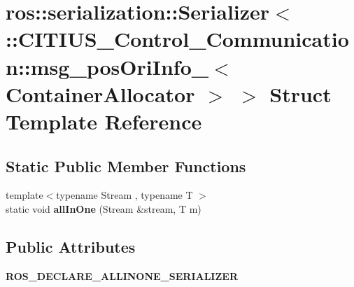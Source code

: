 \hypertarget{structros_1_1serialization_1_1_serializer_3_01_1_1_c_i_t_i_u_s___control___communication_1_1msg_889a6ecf4403a6e0729d3a6c3dc84456}{\section{ros\-:\-:serialization\-:\-:\-Serializer$<$ \-:\-:\-C\-I\-T\-I\-U\-S\-\_\-\-Control\-\_\-\-Communication\-:\-:msg\-\_\-pos\-Ori\-Info\-\_\-$<$ \-Container\-Allocator $>$ $>$ \-Struct \-Template \-Reference}
\label{structros_1_1serialization_1_1_serializer_3_01_1_1_c_i_t_i_u_s___control___communication_1_1msg_889a6ecf4403a6e0729d3a6c3dc84456}
}
\subsection*{\-Static \-Public \-Member \-Functions}
\begin{DoxyCompactItemize}
\item 
\hypertarget{structros_1_1serialization_1_1_serializer_3_01_1_1_c_i_t_i_u_s___control___communication_1_1msg_889a6ecf4403a6e0729d3a6c3dc84456_a9b470fddd584bebeaf1e292825ff7af5}{{\footnotesize template$<$typename Stream , typename T $>$ }\\static void {\bfseries all\-In\-One} (\-Stream \&stream, \-T m)}\label{structros_1_1serialization_1_1_serializer_3_01_1_1_c_i_t_i_u_s___control___communication_1_1msg_889a6ecf4403a6e0729d3a6c3dc84456_a9b470fddd584bebeaf1e292825ff7af5}

\end{DoxyCompactItemize}
\subsection*{\-Public \-Attributes}
\begin{DoxyCompactItemize}
\item 
\hypertarget{structros_1_1serialization_1_1_serializer_3_01_1_1_c_i_t_i_u_s___control___communication_1_1msg_889a6ecf4403a6e0729d3a6c3dc84456_ad35d4bcad909dbd0978ab699dbc40560}{{\bfseries \-R\-O\-S\-\_\-\-D\-E\-C\-L\-A\-R\-E\-\_\-\-A\-L\-L\-I\-N\-O\-N\-E\-\_\-\-S\-E\-R\-I\-A\-L\-I\-Z\-E\-R}}\label{structros_1_1serialization_1_1_serializer_3_01_1_1_c_i_t_i_u_s___control___communication_1_1msg_889a6ecf4403a6e0729d3a6c3dc84456_ad35d4bcad909dbd0978ab699dbc40560}

\end{DoxyCompactItemize}
